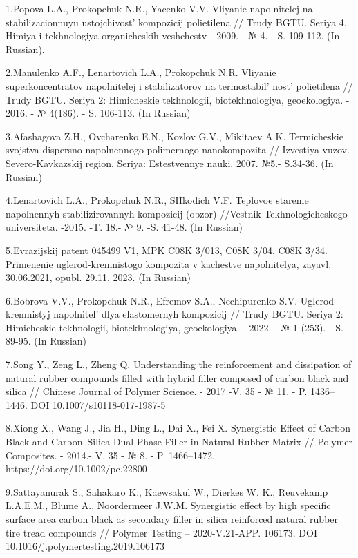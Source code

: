 \begin{references}
1.Popova L.A., Prokopchuk N.R., Yacenko V.V. Vliyanie napolnitelej na
stabilizacionnuyu ustojchivost'{} kompozicij polietilena
// Trudy BGTU. Seriya 4. Himiya i tekhnologiya organicheskih veshchestv
- 2009. - № 4. - S. 109-112. (In Russian).

2.Manulenko A.F., Lenartovich L.A., Prokopchuk N.R. Vliyanie
superkoncentratov napolnitelej i stabilizatorov na
termostabil' nost'{} polietilena // Trudy
BGTU. Seriya 2: Himicheskie tekhnologii, biotekhnologiya, geoekologiya.
- 2016. - № 4(186). - S. 106-113. (In Russian)

3.Afashagova Z.H., Ovcharenko E.N., Kozlov G.V., Mikitaev A.K.
Termicheskie svojstva dispersno-napolnennogo polimernogo nanokompozita
// Izvestiya vuzov. Severo-Kavkazskij region. Seriya: Estestvennye
nauki. 2007. №5.- S.34-36. (In Russian)

4.Lenartovich L.A., Prokopchuk N.R., SHkodich V.F. Teplovoe starenie
napolnennyh stabilizirovannyh kompozicij (obzor) //Vestnik
Tekhnologicheskogo universiteta. -2015. -T. 18.- № 9. -S. 41-48. (In
Russian)

5.Evrazijskij patent 045499 V1, MPK C08K 3/013, C08K 3/04, C08K 3/34.
Primenenie uglerod-kremnistogo kompozita v kachestve napolnitelya,
zayavl. 30.06.2021, opubl. 29.11. 2023. (In Russian)

6.Bobrova V.V., Prokopchuk N.R., Efremov S.A., Nechipurenko S.V.
Uglerod-kremnistyj napolnitel'{} dlya elastomernyh
kompozicij // Trudy BGTU. Seriya 2: Himicheskie tekhnologii,
biotekhnologiya, geoekologiya. - 2022. - № 1 (253). - S. 89-95. (In
Russian)

7.Song Y., Zeng L., Zheng Q. Understanding the reinforcement and
dissipation of natural rubber compounds filled with hybrid filler
composed of carbon black and silica // Chinese Journal of Polymer
Science. - 2017 -V. 35 - № 11. - P. 1436--1446. DOI
10.1007/s10118-017-1987-5

8.Xiong X., Wang J., Jia H., Ding L., Dai X., Fei X. Synergistic Effect
of Carbon Black and Carbon--Silica Dual Phase Filler in Natural Rubber
Matrix // Polymer Composites. - 2014.- V. 35 - № 8. - P. 1466--1472.
https://doi.org/10.1002/pc.22800

9.Sattayanurak S., Sahakaro K., Kaewsakul W., Dierkes W. K., Reuvekamp
L.A.E.M., Blume A., Noordermeer J.W.M. Synergistic effect by high
specific surface area carbon black as secondary filler in silica
reinforced natural rubber tire tread compounds // Polymer Testing --
2020-V.21-APP. 106173. DOI 10.1016/j.polymertesting.2019.106173


\end{references}
